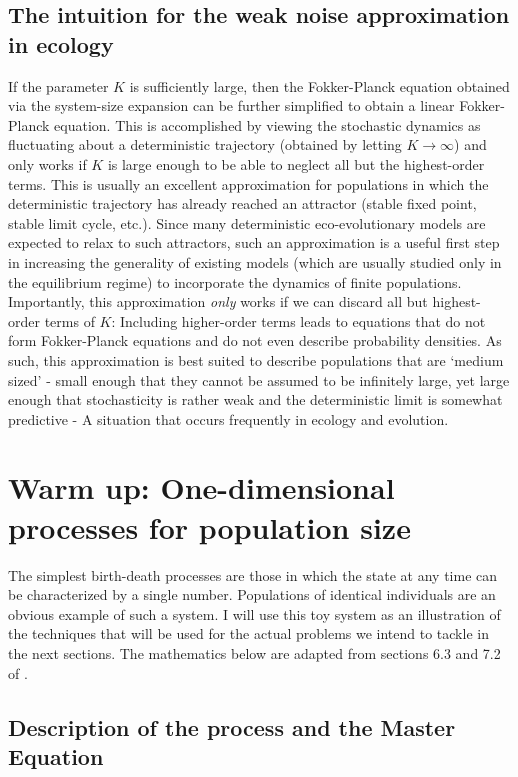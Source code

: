 \subsection{The intuition for the weak noise approximation in ecology}
If the parameter $K$ is sufficiently large, then the Fokker-Planck equation obtained via the system-size expansion can be further simplified to obtain a linear Fokker-Planck equation. This is accomplished by viewing the stochastic dynamics as fluctuating about a deterministic trajectory (obtained by letting $K \to \infty$) and only works if $K$ is large enough to be able to neglect all but the highest-order terms. This is usually an excellent approximation for populations in which the deterministic trajectory has already reached an attractor (stable fixed point, stable limit cycle, etc.). Since many deterministic eco-evolutionary models are expected to relax to such attractors, such an approximation is a useful first step in increasing the generality of existing models (which are usually studied only in the equilibrium regime) to incorporate the dynamics of finite populations. Importantly, this approximation \emph{only} works if we can discard all but highest-order terms of $K$: Including higher-order terms leads to equations that do not form Fokker-Planck equations and do not even describe probability densities. As such, this approximation is best suited to describe populations that are `medium sized' - small enough that they cannot be assumed to be infinitely large, yet large enough that stochasticity is rather weak and the deterministic limit is somewhat predictive - A situation that occurs frequently in ecology and evolution.

\section{Warm up: One-dimensional processes for population size}\label{sec_1D_processes}
The simplest birth-death processes are those in which the state at any time can be characterized by a single number. Populations of identical individuals are an obvious example of such a system. I will use this toy system as an illustration of the techniques that will be used for the actual problems we intend to tackle in the next sections. The mathematics below are adapted from sections 6.3 and 7.2 of \citep{gardiner_stochastic_2009}.

\subsection{Description of the process and the Master Equation}

